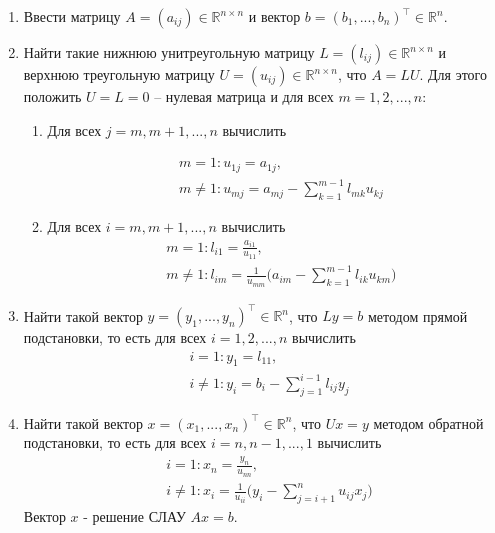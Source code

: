 \documentclass[a4paper, 12pt]{article}
\begin{document}
	\begin{enumerate}
		\item Ввести матрицу $A=(a_{ij})\in \mathbb{R}^{n\times n}$ и вектор $b=(b_1,...,b_n)^\top\in \mathbb{R}^n$.
		\item Найти такие нижнюю унитреугольную матрицу $L=(l_{ij})\in \mathbb{R}^{n\times n}$ и верхнюю треугольную матрицу $U=(u_{ij})\in \mathbb{R}^{n\times n}$, что $A=LU$. Для этого положить $U=L=0$ -- нулевая матрица и
		для всех $m = 1,2,...,n$:
		\begin{enumerate}
			\item Для всех $j = m,m+1,...,n$ вычислить

			\begin{equation} 
				\label{U_formula}
				\begin{aligned}
					&m=1:u_{1j}=a_{1j}, \\
					&m\neq 1: u_{mj}=a_{mj}-\sum\limits_{k=1}^{m-1}l_{mk}u_{kj}
				\end{aligned}
			\end{equation}
			\item Для всех $i = m,m+1,...,n$ вычислить
			\begin{equation}
				\label{L_formula}
				\begin{aligned}
					&m=1:l_{i1}=\frac{a_{i1}}{u_{11}},\\
					&m\neq 1:l_{im}=\frac{1}{u_{mm}}\Bigg(a_{im}-\sum\limits_{k=1}^{m-1} l_{ik}u_{km}\Bigg)
				\end{aligned}
			\end{equation}
		\end{enumerate}
		\item Найти такой вектор $y=(y_1,...,y_n)^\top \in \mathbb{R}^n$, что $Ly=b$ методом прямой подстановки, то есть для всех $i=1,2,...,n$ вычислить
		\begin{equation}
			\label{y_formula}
			\begin{aligned}
				&i=1:y_1=l_{11}, \\
				&i\neq 1:y_i=b_i-\sum\limits_{j=1}^{i-1}l_{ij}y_j
			\end{aligned}			
		\end{equation}
		\item Найти такой вектор $x=(x_1,...,x_n)^\top \in \mathbb{R}^n$, что $Ux=y$ методом обратной подстановки, то есть для всех $i=n,n-1,...,1$ вычислить
		\begin{equation}
			\label{x_formula}
			\begin{aligned}
				&i=1:x_n=\frac{y_n}{u_{nn}},\\
				&i\neq 1:x_i=\frac{1}{u_{ii}}\Bigg(y_i-\sum\limits_{j=i+1}^{n}u_{ij}x_j\Bigg)
			\end{aligned}
		\end{equation}
		Вектор $x$ - решение СЛАУ $Ax=b$.
	\end{enumerate}
\end{document}
